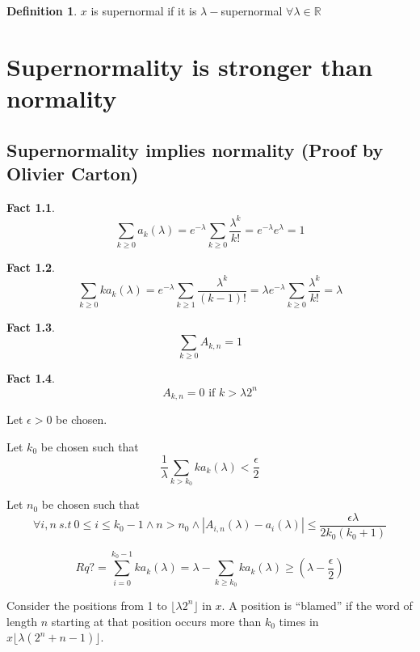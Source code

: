 \documentclass[11pt,a4paper,twoside]{tesis}
\newtheorem{fact}{Fact}[section]
\theoremstyle{definition}
\newtheorem{definition}{Definition}[section]
\begin{document}
\begin{definition}
    $x$ is supernormal if it is $\lambda-$supernormal $\forall \lambda \in \mathds{R}$
\end{definition}

\chapter{Supernormality is stronger than normality}
\section{Supernormality implies normality (Proof by Olivier Carton)}



\begin{fact}
    $$\sum_{k \geq 0} a_k(\lambda) = e^{-\lambda}\sum_{k \geq 0} \frac{\lambda^k}{k!} = e^{-\lambda}e^{\lambda} = 1$$
\end{fact}

\begin{fact}
    $$\sum_{k \geq 0} ka_k(\lambda) = e^{-\lambda}\sum_{k \geq 1} \frac{\lambda^k}{(k-1)!} = \lambda e^{-\lambda} \sum_{k \geq 0} \frac{\lambda^k}{k!}= \lambda$$
\end{fact}





\begin{fact}
    $$\sum_{k \geq 0} A_{k,n} = 1$$
\end{fact}

\begin{fact}
    $$A_{k,n} = 0 \textrm{ if } k > \lambda2^n$$
\end{fact}

Let $\epsilon > 0$ be chosen.

Let $k_0$ be chosen such that 
$$\frac{1}{\lambda} \sum_{k > k_0} ka_k(\lambda) < \frac{\epsilon}{2}$$

Let $n_0$ be chosen such that 
$$\forall i,n \: s.t \:  0 \leq i \leq k_0 - 1 \wedge n > n_0 \wedge |A_{i,n}(\lambda) - a_i(\lambda)| \leq \frac{\epsilon\lambda}{2k_0(k_0+1)}$$

$$Rq? = \sum_{i=0}^{k_0-1} ka_k(\lambda) = \lambda - \sum_{k\geq k_0} ka_k(\lambda) \geq (\lambda - \frac{\epsilon}{2})$$

Consider the positions from 1 to $\lfloor\lambda2^n\rfloor$ in $x$. A position is ``blamed'' if the word of length $n$ starting at that position occurs more than $k_0$ times in $x\lfloor\lambda(2^n+n-1)\rfloor$.
\end{document}
